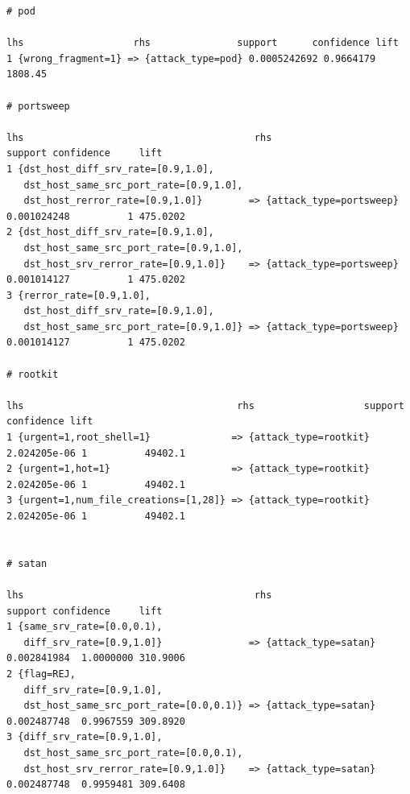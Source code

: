 \documentclass[11pt]{article}
\begin{document}
\begin{Verbatim}[fontsize=\tiny]
# pod

lhs                   rhs               support      confidence lift   
1 {wrong_fragment=1} => {attack_type=pod} 0.0005242692 0.9664179  1808.45

# portsweep

lhs                                        rhs                         support confidence     lift
1 {dst_host_diff_srv_rate=[0.9,1.0],                                                                
   dst_host_same_src_port_rate=[0.9,1.0],                                                           
   dst_host_rerror_rate=[0.9,1.0]}        => {attack_type=portsweep} 0.001024248          1 475.0202
2 {dst_host_diff_srv_rate=[0.9,1.0],                                                                
   dst_host_same_src_port_rate=[0.9,1.0],                                                           
   dst_host_srv_rerror_rate=[0.9,1.0]}    => {attack_type=portsweep} 0.001014127          1 475.0202
3 {rerror_rate=[0.9,1.0],                                                                           
   dst_host_diff_srv_rate=[0.9,1.0],                                                                
   dst_host_same_src_port_rate=[0.9,1.0]} => {attack_type=portsweep} 0.001014127          1 475.0202
   
# rootkit

lhs                                     rhs                   support      confidence lift   
1 {urgent=1,root_shell=1}              => {attack_type=rootkit} 2.024205e-06 1          49402.1
2 {urgent=1,hot=1}                     => {attack_type=rootkit} 2.024205e-06 1          49402.1
3 {urgent=1,num_file_creations=[1,28]} => {attack_type=rootkit} 2.024205e-06 1          49402.1


# satan

lhs                                        rhs                     support confidence     lift
1 {same_srv_rate=[0.0,0.1),                                                                     
   diff_srv_rate=[0.9,1.0]}               => {attack_type=satan} 0.002841984  1.0000000 310.9006
2 {flag=REJ,                                                                                    
   diff_srv_rate=[0.9,1.0],                                                                     
   dst_host_same_src_port_rate=[0.0,0.1)} => {attack_type=satan} 0.002487748  0.9967559 309.8920
3 {diff_srv_rate=[0.9,1.0],                                                                     
   dst_host_same_src_port_rate=[0.0,0.1),                                                       
   dst_host_srv_rerror_rate=[0.9,1.0]}    => {attack_type=satan} 0.002487748  0.9959481 309.6408
   

\end{Verbatim}
\end{document}
